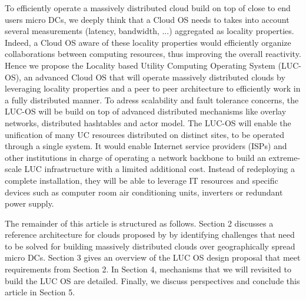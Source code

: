 To efficiently operate a massively distributed cloud build on top of close to 
end users micro DCs, we deeply think that a Cloud OS needs to takes into account 
several measurements (latency, bandwidth, ...) aggregated as locality 
properties. Indeed, a Cloud OS aware of these locality properties would 
efficiently organize collaborations between computing resources, thus improving 
the overall reactivity. Hence we propose the Locality based Utility Computing 
Operating System (LUC-OS), an advanced Cloud OS that will operate massively 
distributed clouds by leveraging locality properties and a peer to peer 
architecture to efficiently work in a fully distributed manner. To adress 
scalability and fault tolerance concerns, the LUC-OS will be build on top of
advanced distributed mechanisms like overlay networks, distributed hashtables 
and actor model. The LUC-OS will enable the unification of many UC resources 
distributed on distinct sites, to be operated through a single system. It would 
enable Internet service providers (ISPs) and other institutions in charge of 
operating a network backbone to build an extreme-scale LUC infrastructure with a 
limited additional cost. Instead of redeploying a complete installation, they 
will be able to leverage IT resources and specific devices such as computer room
air conditioning units, inverters or redundant power supply.



The remainder of this article is structured as follows. Section 2 discusses a 
reference architecture for clouds proposed by \cite{moreno2012iaas} by 
identifying challenges that need to be solved for building massively distributed 
clouds over geographically spread micro DCs. Section 3 gives an overview of the 
LUC OS design proposal that meet requirements from Section 2. In Section 4, 
mechanisms that we will revisited to build the LUC OS are detailed. Finally, we discuss perspectives and conclude this article in Section 5.